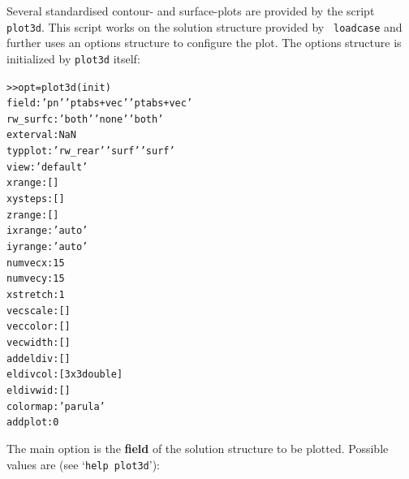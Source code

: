 \documentclass[12pt]{report}
\begin{document}
Several standardised contour- and surface-plots are provided by the script
{\tt plot3d}. This script works on the solution structure provided by {\tt
loadcase} and further uses an options structure to configure the plot. The
options structure is initialized by {\tt plot3d} itself:
\begin{alltt}\small
>> opt = plot3d(init)
       field:   'pn'                 'ptabs+vec'          'ptabs+vec'
    rw_surfc:   'both'               'none'               'both'
    exterval:   NaN
     typplot:   'rw_rear'            'surf'               'surf'
        view:   'default'
      xrange:   []
     xysteps:   []
      zrange:   []
     ixrange:   'auto'
     iyrange:   'auto'
     numvecx:   15
     numvecy:   15
    xstretch:   1
    vecscale:   []
    veccolor:   []
    vecwidth:   []
    addeldiv:   []
    eldivcol:   [3x3 double]
    eldivwid:   []
    colormap:   'parula'
     addplot:   0
\end{alltt}
The main option is the {\bf field} of the solution structure to be plotted.
Possible values are (see `{\tt help plot3d}'):
\end{document}
